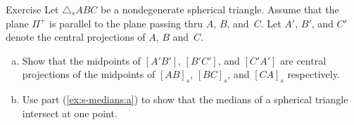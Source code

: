 \begin{thm}{Exercise}\label{ex:s-medians}
Let $\triangle_sABC$ be a nondegenerate spherical triangle.
Assume that the plane $\Pi^+$ is parallel to the plane passing thru $A$, $B$, and~$C$.
Let $A'$, $B'$, and $C'$ denote the central projections of $A$, $B$ and~$C$.
\begin{enumerate}[(a)]
\item\label{ex:s-medians:a} Show that the midpoints of $[A'B']$, $[B'C']$, and $[C'A']$
are central projections of the midpoints of $[AB]_s$, $[BC]_s$, and $[CA]_s$ respectively.
\item\label{ex:s-medians:b} Use part (\ref{ex:s-medians:a}) to show that the medians of a spherical triangle intersect at one point.
\end{enumerate}

\end{thm}
